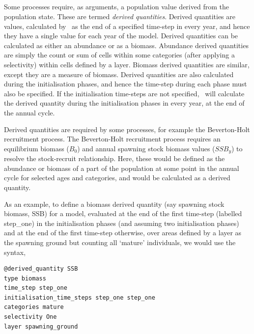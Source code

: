 \subsection{\label{sec:derived-quantities}}

Some processes require, as arguments, a population value derived from the population state. These are termed \emph{derived quantities}. Derived quantities are values, calculated by \SPM\ as the end of a specified time-step in every year, and hence they have a single value for each year of the model. Derived quantities can be calculated as either an abundance or as a biomass. Abundance derived quantities are simply the count or sum of cells within some categories (after applying a selectivity) within cells defined by a layer. Biomass derived quantities are similar, except they are a measure of biomass. Derived quantities are also calculated during the initialisation phases, and hence the time-step during each phase must also be specified. If the initialisation time-steps are not specified, \SPM\ will calculate the derived quantity during the initialisation phases in every year, at the end of the annual cycle.

Derived quantities are required by some processes, for example the Beverton-Holt recruitment process. The Beverton-Holt recruitment process requires an equilibrium biomass ($B_0$) and annual spawning stock biomass values ($SSB_y$) to resolve the stock-recruit relationship. Here, these would be defined as the abundance or biomass of a part of the population at some point in the annual cycle for selected ages and categories, and would be calculated as a derived quantity.

As an example, to define a biomass derived quantity (say spawning stock biomass, SSB) for a model, evaluated at the end of the first time-step (labelled step\_one) in the initialisation phases (and assuming two initialisation phases) and at the end of the first time-step otherwise, over areas defined by a layer as the spawning ground but counting all `mature' individuals, we would use the syntax,

{\small{\begin{verbatim}
@derived_quantity SSB
type biomass
time_step step_one
initialisation_time_steps step_one step_one
categories mature
selectivity One
layer spawning_ground
\end{verbatim}}}

\subsection{\label{sec:derived-quantity-by-cell}}

